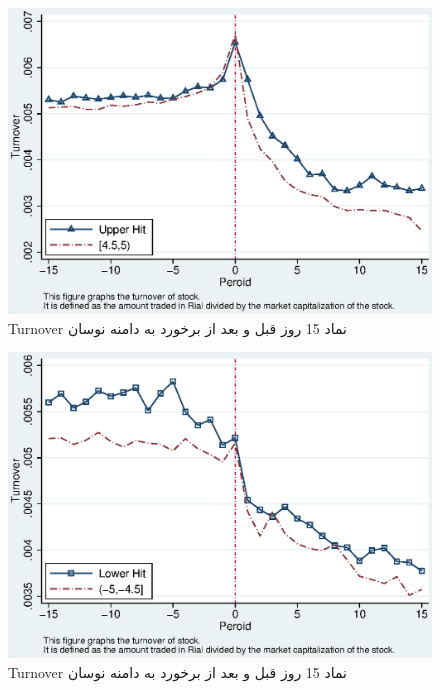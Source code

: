 \documentclass[12pt]{article}
\begin{document}
\begin{appendices}
\begin{figure}[htbp]
\centering
\includegraphics[width=0.8\columnwidth]{CUT.eps}
\caption{Turnover نماد 15 روز قبل و بعد از برخورد به دامنه نوسان}
\label{g26}
\end{figure}
\begin{figure}[htbp]
\centering
\includegraphics[width=0.8\columnwidth]{CLT.eps}
\caption{Turnover نماد 15 روز قبل و بعد از برخورد به دامنه نوسان}
\label{g27}
\end{figure}


\end{appendices}
\end{document}
